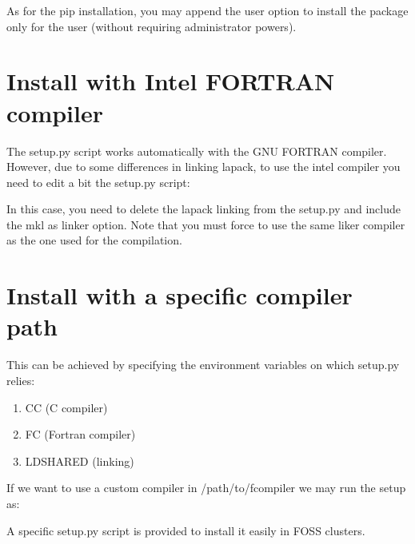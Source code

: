 \documentclass[a4paper,11pt,english]{sphinxmanual}
\begin{document}
\sphinxAtStartPar
As for the pip installation, you may append the \textendash{}user option to install the package only for the user (without requiring administrator powers).


\section{Install with Intel FORTRAN compiler}
\label{\detokenize{install:install-with-intel-fortran-compiler}}
\sphinxAtStartPar
The setup.py script works automatically with the GNU FORTRAN compiler. However, due to some differences in linking lapack,
to use the intel compiler you need to edit a bit the setup.py script:

\sphinxAtStartPar
In this case, you need to delete the lapack linking from the
setup.py and include the \sphinxhyphen{}mkl as linker option.
Note that you must force to use the same liker compiler as the one used for the compilation.


\section{Install with a specific compiler path}
\label{\detokenize{install:install-with-a-specific-compiler-path}}
\sphinxAtStartPar
This can be achieved by specifying the environment variables on which setup.py relies:
\begin{enumerate}
%
\item {} 
\sphinxAtStartPar
CC (C compiler)

\item {} 
\sphinxAtStartPar
FC (Fortran compiler)

\item {} 
\sphinxAtStartPar
LDSHARED (linking)

\end{enumerate}

\sphinxAtStartPar
If we want to use a custom compiler in /path/to/fcompiler we may run the setup as:

\begin{sphinxVerbatim}[commandchars=\\\{\}]
\end{sphinxVerbatim}

\sphinxAtStartPar
A specific setup.py script is provided to install it easily in FOSS clusters.

\sphinxstepscope
\end{document}
